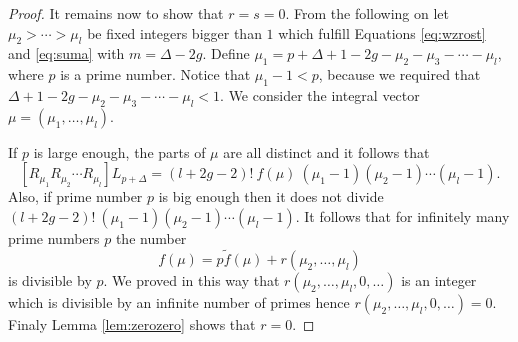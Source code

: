 \documentclass[12pt]{amsart}
\theoremstyle{plain}
\theoremstyle{remark}
\begin{document}
\begin{proof}
It remains now to show that $r=s=0$. From the following on let $\mu_2> \cdots >
\mu_l$ be fixed integers bigger than
$1$ which fulfill Equations \eqref{eq:wzrost} and \eqref{eq:suma} with $m =
\Delta - 2g$. 
Define
$\mu_1=p+\Delta+1-2g-\mu_2-\mu_3-\cdots-\mu_l$,
where $p$ is a prime number. Notice that $\mu_1 - 1 < p$, because we required
that $\Delta+1-2g-\mu_2-\mu_3-\cdots-\mu_l < 1$. We consider the integral vector
$\mu=(\mu_1,\dots,\mu_l)$.

If $p$ is large enough, the parts of $\mu$ are all distinct and it follows
that
$$[R_{\mu_1} R_{\mu_2} \cdots R_{\mu_l}] L_{p+\Delta} =   (l+2g-2)!\ f(\mu)\
(\mu_1-1)(\mu_2-1)\cdots(\mu_l-1).$$
Also, if prime number $p$ is big enough then it does not divide
$(l+2g-2)!\ (\mu_1-1)(\mu_2-1)\cdots(\mu_l-1)$. It follows that
for infinitely
many prime numbers $p$ the number
$$ f(\mu)=  p \tilde{f}(\mu) + r(\mu_2, \dots, \mu_l)  $$
is divisible by $p$. We proved in this way that $r(\mu_2, \dots, \mu_l,
0,
\dots)$ is an
integer which is divisible by an infinite number of primes hence
$r(\mu_2, \dots, \mu_l, 0, \dots)=0$. Finaly Lemma \ref{lem:zerozero}
shows
that $r=0$.


\end{proof}
\end{document}
